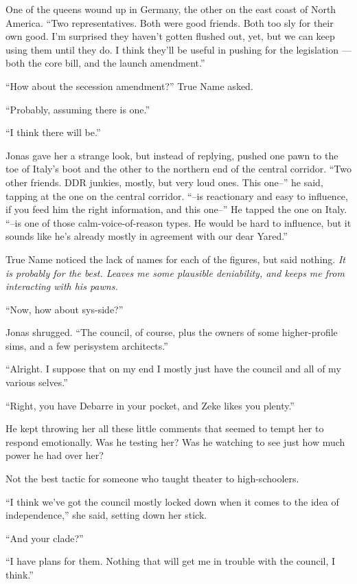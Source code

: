 One of the queens wound up in Germany, the other on the east coast of North America. ``Two representatives. Both were good friends. Both too sly for their own good. I'm surprised they haven't gotten flushed out, yet, but we can keep using them until they do. I think they'll be useful in pushing for the legislation — both the core bill, and the launch amendment.''

``How about the secession amendment?'' True Name asked.

``Probably, assuming there is one.''

``I think there will be.''

Jonas gave her a strange look, but instead of replying, pushed one pawn to the toe of Italy's boot and the other to the northern end of the central corridor. ``Two other friends. DDR junkies, mostly, but very loud ones. This one--'' he said, tapping at the one on the central corridor. ``--is reactionary and easy to influence, if you feed him the right information, and this one--'' He tapped the one on Italy. ``--is one of those calm-voice-of-reason types. He would be hard to influence, but it sounds like he's already mostly in agreement with our dear Yared.''

True Name noticed the lack of names for each of the figures, but said nothing. \emph{It is probably for the best. Leaves me some plausible deniability, and keeps me from interacting with his pawns.}

``Now, how about sys-side?''

Jonas shrugged. ``The council, of course, plus the owners of some higher-profile sims, and a few perisystem architects.''

``Alright. I suppose that on my end I mostly just have the council and all of my various selves.''

``Right, you have Debarre in your pocket, and Zeke likes you plenty.''

He kept throwing her all these little comments that seemed to tempt her to respond emotionally. Was he testing her? Was he watching to see just how much power he had over her?

Not the best tactic for someone who taught theater to high-schoolers.

``I think we've got the council mostly locked down when it comes to the idea of independence,'' she said, setting down her stick.

``And your clade?''

``I have plans for them. Nothing that will get me in trouble with the council, I think.''

